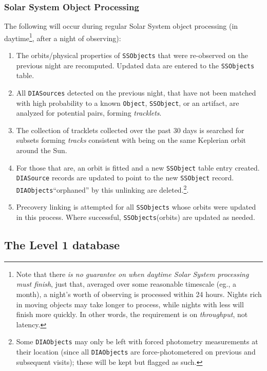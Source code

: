 \documentclass[12pt]{article}
\newcommand{\code}[1]{\texttt{#1}}
\newcommand{\DIASource}{\code{DIASource}\xspace}
\newcommand{\DIASources}{\code{DIASources}\xspace}
\newcommand{\DIAObjects}{\code{DIAObjects}\xspace}
\newcommand{\DB}{{Level 1 database}\xspace}
\newcommand{\Object}{\code{Object}\xspace}
\newcommand{\SSObject}{\code{SSObject}\xspace}
\newcommand{\SSObjects}{\code{SSObjects}\xspace}
\begin{document}
\subsubsection{Solar System Object Processing}
\label{sec:ssProcessing}

The following will occur during regular Solar System object processing (in
daytime\footnote{Note that there {\em is no guarantee on when daytime Solar
System processing must finish}, just that, averaged over some reasonable
timescale (eg., a month), a night's worth of observing is processed within 24
hours. Nights rich in moving objects may take longer to process, while nights
with less will finish more quickly. In other words, the requirement is on {\em
throughput}, not latency.}, after a night of observing):
%
\begin{enumerate}
\item The orbits/physical properties of \SSObjects that were re-observed on
      the previous night are recomputed. Updated data are entered to the
      \SSObjects table.
\item All \DIASources detected on the previous night, that have not been
      matched with high probability to a known \Object, \SSObject, or an
      artifact, are analyzed for potential pairs, forming {\em tracklets}.
\item The collection of tracklets collected over the past 30 days is searched
      for subsets forming {\em tracks} consistent with being on the same
      Keplerian orbit around the Sun.
\item For those that are, an orbit is fitted and a new \SSObject table entry
      created. \DIASource records are updated to point to the new \SSObject
      record. \DIAObjects ``orphaned'' by this unlinking are
      deleted.\footnote{Some \DIAObjects may only be left with forced
      photometry measurements at their location (since all \DIAObjects are
      force-photometered on previous and subsequent visits); these will be
      kept but flagged as such.}.
\item Precovery linking is attempted for all \SSObjects whose orbits were
      updated in this process. Where successful, \SSObjects (orbits) are
      updated as needed.
\end{enumerate}

\subsection{The \DB}
\label{sec:level1db}
\end{document}
